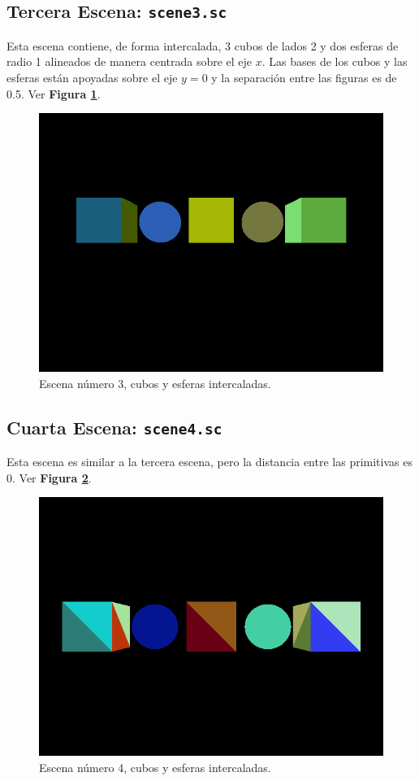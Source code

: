 \documentclass[a4paper,10pt]{article}
\begin{document}
\subsection{Tercera Escena: \texttt{scene3.sc}}
Esta escena contiene, de forma intercalada, 3 cubos de lados 2 y dos esferas de radio 1 alineados de manera centrada sobre el eje $x$.  Las bases de los cubos y las esferas est\'an apoyadas sobre el eje $y=0$ y la separaci\'on entre las figuras es de 0.5. Ver \textbf{Figura \ref{fig:3}}.

\begin{figure}[h]
 \centering
 \includegraphics[width=320pt,keepaspectratio=true]{../scene3.png}
 \caption{Escena n\'umero 3, cubos y esferas intercaladas.}
 \label{fig:3}
\end{figure}

\subsection{Cuarta Escena: \texttt{scene4.sc}}
Esta escena es similar a la tercera escena, pero la distancia entre las primitivas es 0.  Ver \textbf{Figura \ref{fig:4}}.

\begin{figure}[h]
 \centering
 \includegraphics[width=320pt,keepaspectratio=true]{../scene4.png}
 \caption{Escena n\'umero 4, cubos y esferas intercaladas.}
 \label{fig:4}
\end{figure}
\end{document}
